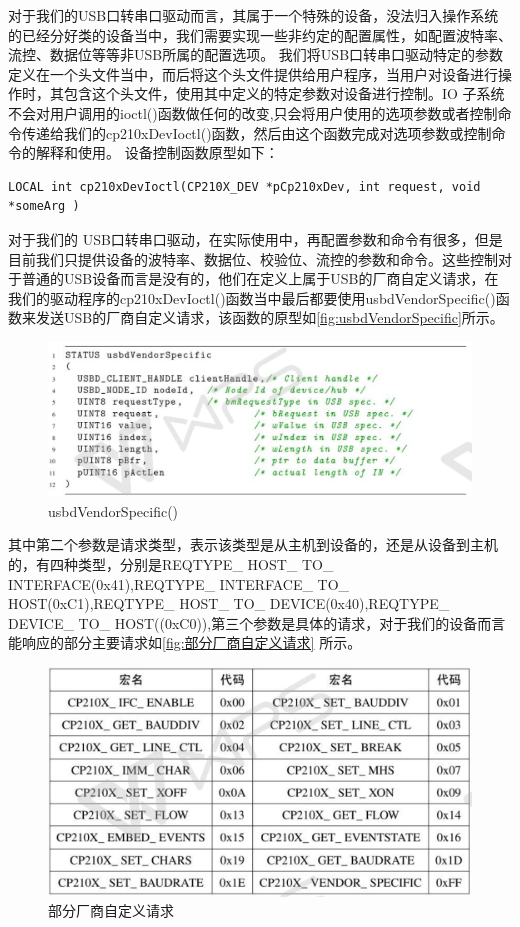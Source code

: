 	对于我们的USB口转串口驱动而言，其属于一个特殊的设备，没法归入操作系统的已经分好类的设备当中，我们需要实现一些非约定的配置属性，如配置波特率、流控、数据位等等非USB所属的配置选项。
	我们将USB口转串口驱动特定的参数定义在一个头文件当中，而后将这个头文件提供给用户程序，当用户对设备进行操作时，其包含这个头文件，使用其中定义的特定参数对设备进行控制。IO 子系统不会对用户调用的ioctl()函数做任何的改变,只会将用户使用的选项参数或者控制命令传递给我们的cp210xDevIoctl()函数，然后由这个函数完成对选项参数或控制命令的解释和使用。
设备控制函数原型如下：
\lstset{language=C}
\begin{lstlisting}
LOCAL int cp210xDevIoctl(CP210X_DEV *pCp210xDev, int request, void *someArg )
\end{lstlisting}

对于我们的 USB口转串口驱动，在实际使用中，再配置参数和命令有很多，但是目前我们只提供设备的波特率、数据位、校验位、流控的参数和命令。这些控制对于普通的USB设备而言是没有的，他们在定义上属于USB的厂商自定义请求，在我们的驱动程序的cp210xDevIoctl()函数当中最后都要使用usbdVendorSpecific()函数来发送USB的厂商自定义请求，该函数的原型如\autoref{fig:usbdVendorSpecific}所示。


\begin{figure}[!h]
\centering
\includegraphics[width=1.0\textwidth]{./graphics/usbdVendorSpecify.pdf}
\caption{usbdVendorSpecific()}\label{fig:usbdVendorSpecific}
\end{figure}

其中第二个参数是请求类型，表示该类型是从主机到设备的，还是从设备到主机的，有四种类型，分别是REQTYPE\_ HOST\_ TO\_ INTERFACE(0x41),REQTYPE\_ INTERFACE\_ TO\_ HOST(0xC1),REQTYPE\_ HOST\_ TO\_ DEVICE(0x40),REQTYPE\_ DEVICE\_ TO\_ HOST((0xC0)),第三个参数是具体的请求，对于我们的设备而言能响应的部分主要请求如\autoref{fig:部分厂商自定义请求} 所示。

\begin{figure}[!h]
\centering
\includegraphics[width=1.0\textwidth]{./graphics/vendorSpecify.pdf}
\caption{部分厂商自定义请求}\label{fig:部分厂商自定义请求}
\end{figure}


